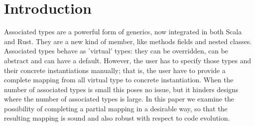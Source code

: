 \section{Introduction}

Associated types are a powerful form of generics, now integrated in both Scala and Rust.
They are a new kind of member, like methods fields and nested classes.
Associated types behave as 'virtual' types: they can be overridden, can be abstract and can have
a default.
However, the user has to specify those types and their concrete instantiations manually; that is, the user
have to provide a complete mapping from all virtual type to concrete instantiation.
When the number of associated types is small this poses no issue, but it hinders designs where the number of
associated types is large. In this paper we examine the possibility of completing
a partial mapping in a desirable way, so that the resulting mapping is sound and also robust with
respect to code evolution.

